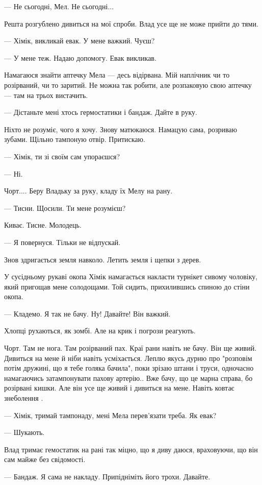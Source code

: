 — Не сьогодні,  Мел. Не сьогодні...

Решта розгублено дивиться на мої спроби.  Влад усе ще не може прийти до тями. 

— Хімік, викликай евак. У мене важкий. Чуєш? 

— У мене теж. Надаю допомогу. Евак  викликав. 

Намагаюся знайти аптечку Мела — десь відірвана. Мій наплічник чи то розірваний,
чи то заритий. Не можна так робити, але розпаковую свою аптечку — там на трьох
вистачить. 

— Дістаньте мені хтось гермостатики і бандаж. Дайте в руку. 

Ніхто не розуміє, чого я хочу. Знову матюкаюся. Намацую сама, розриваю зубами.
Щільно тампоную отвір. Притискаю. 

— Хімік, ти зі своїм сам упораєшся? 

— Ні. 

Чорт.... Беру Владьку за руку, кладу їх Мелу на рану. 

— Тисни. Щосили. Ти мене розумієш? 

Киває. Тисне. Молодець. 

— Я повернуся. Тільки не відпускай.

Знов здригається земля навколо. Летить земля і щепки з дерев. 

У сусідньому рукаві окопа Хімік намагається накласти турнікет сивому чоловіку,
який пригощав мене солодощами. Той сидить,  прихилившись спиною до стіни окопа.  

— Кладемо. Я так не бачу. Ну! Давайте! Він важкий. 

Хлопці рухаються, як зомбі. Але на крик і погрози реагують. 

Чорт. Там не нога. Там розірваний пах. Краї рани навіть не бачу. Він ще живий.
Дивиться на мене й ніби навіть усміхається. Леплю якусь дурню про "розповім
потім дружині, що я тебе голяка бачила", поки зрізаю штани і труси, одночасно
намагаючись затампонувати  пахову артерію.. Вже бачу, що це марна справа,  бо
розірвані кишки. Але він усе ще живий і дивиться на мене. Навіть ковтає
знеболення . 

— Хімік, тримай тампонаду, мені Мела перев'язати треба. Як евак?

— Шукають.

Влад тримає гемостатик на рані так міцно, що я диву даюся, враховуючи, що він
сам майже без свідомості. 

— Бандаж. Я сама не накладу. Припідніміть його трохи. Давайте. 

